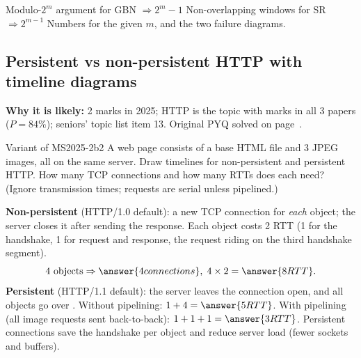 \begin{answerplan}[2.5 marks]
 Modulo-$2^m$ argument for GBN $\Rightarrow 2^m-1$ \quad {} Non-overlapping windows for SR $\Rightarrow 2^{m-1}$ \quad {} Numbers for the given $m$, and the two failure diagrams.
\end{answerplan}

\subsection{Persistent vs non-persistent HTTP with timeline diagrams}\label{iq:C11}
    

\textbf{Why it is likely:} 2 marks in 2025; HTTP is the topic with marks in all 3 papers ($P=84\%$); seniors' topic list item 13. Original PYQ solved on page~\pageref{q:MS2025-2b}.

\begin{question}{Variant of MS2025-2b}{2}
A web page consists of a base HTML file and 3 JPEG images, all on the same server. Draw timelines for non-persistent and persistent HTTP. How many TCP connections and how many RTTs does each need? (Ignore transmission times; requests are serial unless pipelined.)
\end{question}
\begin{solution}
\textbf{Non-persistent} (HTTP/1.0 default): a new TCP connection for \emph{each} object; the server closes it after sending the response. Each object costs 2 RTT (1 for the handshake, 1 for request and response, the request riding on the third handshake segment).
\[ 4 \text{ objects} \Rightarrow \answer{4 connections}, \; 4\times2 = \answer{8 RTT}. \]
\textbf{Persistent} (HTTP/1.1 default): the server leaves the connection open, and all objects go over .
Without pipelining: $1+4=\answer{5 RTT}$. With pipelining (all image requests sent back-to-back): $1+1+1=\answer{3 RTT}$.
Persistent connections save the handshake per object and reduce server load (fewer sockets and buffers).
\end{solution}

